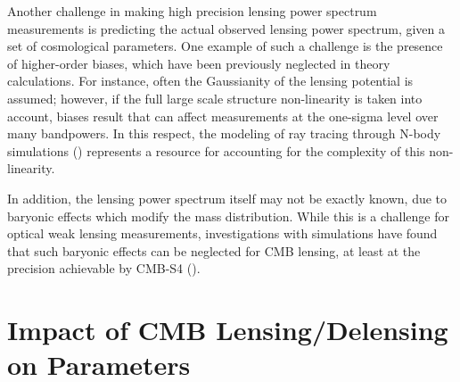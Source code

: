 Another challenge in making high precision lensing power spectrum measurements is predicting the actual observed lensing power spectrum, given a set of cosmological parameters. One example of such a challenge is the presence of higher-order biases, which have been previously neglected in theory calculations. For instance, often the Gaussianity of the lensing potential is assumed; however, if the full large scale structure non-linearity is taken into account, biases result that can affect measurements at the one-sigma level over many bandpowers. In this respect, the modeling of ray tracing through N-body simulations (\cite{Calabrese:2014gla}) represents a resource for accounting for the complexity of this non-linearity.


In addition, the lensing power spectrum itself may not be exactly known, due to baryonic effects which modify the mass distribution. While this is a challenge for optical weak lensing measurements, investigations with simulations have found that such baryonic effects can be neglected for CMB lensing, at least at the precision achievable by CMB-S4 (\cite{Natarajan:2014xba}).

\section{Impact of CMB Lensing/Delensing on Parameters}\label{forecasts}

